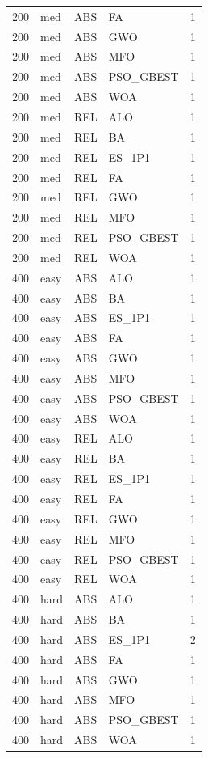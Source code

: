 \begin{tabular}{r l l l l}
200 & med & ABS & FA & 1 \\
200 & med & ABS & GWO & 1 \\
200 & med & ABS & MFO & 1 \\
200 & med & ABS & PSO_GBEST & 1 \\
200 & med & ABS & WOA & 1 \\
200 & med & REL & ALO & 1 \\
200 & med & REL & BA & 1 \\
200 & med & REL & ES_1P1 & 1 \\
200 & med & REL & FA & 1 \\
200 & med & REL & GWO & 1 \\
200 & med & REL & MFO & 1 \\
200 & med & REL & PSO_GBEST & 1 \\
200 & med & REL & WOA & 1 \\
400 & easy & ABS & ALO & 1 \\
400 & easy & ABS & BA & 1 \\
400 & easy & ABS & ES_1P1 & 1 \\
400 & easy & ABS & FA & 1 \\
400 & easy & ABS & GWO & 1 \\
400 & easy & ABS & MFO & 1 \\
400 & easy & ABS & PSO_GBEST & 1 \\
400 & easy & ABS & WOA & 1 \\
400 & easy & REL & ALO & 1 \\
400 & easy & REL & BA & 1 \\
400 & easy & REL & ES_1P1 & 1 \\
400 & easy & REL & FA & 1 \\
400 & easy & REL & GWO & 1 \\
400 & easy & REL & MFO & 1 \\
400 & easy & REL & PSO_GBEST & 1 \\
400 & easy & REL & WOA & 1 \\
400 & hard & ABS & ALO & 1 \\
400 & hard & ABS & BA & 1 \\
400 & hard & ABS & ES_1P1 & 2 \\
400 & hard & ABS & FA & 1 \\
400 & hard & ABS & GWO & 1 \\
400 & hard & ABS & MFO & 1 \\
400 & hard & ABS & PSO_GBEST & 1 \\
400 & hard & ABS & WOA & 1 \\

\end{tabular}
